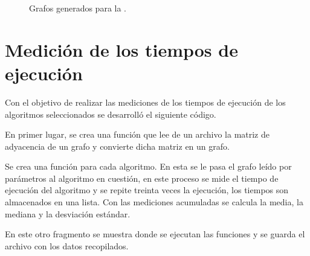 \documentclass{article}
\begin{document}
\begin{figure}[htbp]

\caption{Grafos generados para la .} 
\end{figure}
\newpage

\section{Medición de los tiempos de ejecución}

Con el objetivo de realizar las mediciones de los tiempos de ejecución de los algoritmos seleccionados se desarrolló el siguiente código.

En primer lugar, se crea una función que lee de un archivo la matriz de adyacencia de un grafo y convierte dicha matriz en un grafo.
\begin{center}

\end{center}
Se crea una función para cada algoritmo. En esta se le pasa el grafo leído por parámetros al algoritmo en cuestión, en este proceso se mide el tiempo de ejecución del algoritmo y se repite treinta veces la ejecución, los tiempos son almacenados en una lista. Con las mediciones acumuladas se calcula la media, la mediana y la desviación estándar.
 \begin{center}

\end{center}
En este otro fragmento se muestra donde se ejecutan las funciones y se guarda el archivo con los datos recopilados.
 \begin{center}

\end{center}
\end{document}

